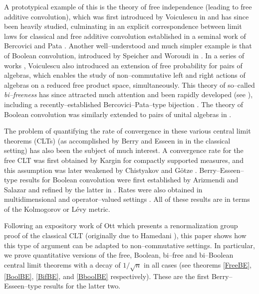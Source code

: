 \documentclass{amsart}
\theoremstyle{definition}
\theoremstyle{remark}
\numberwithin{equation}{section}
\begin{document}
A prototypical example of this is the theory of free independence (leading to free additive convolution), which was first introduced by Voiculescu in \cite{voic} and has since been heavily studied, culminating in an explicit correspondence between limit laws for classical and free additive convolution established in a seminal work of Bercovici and Pata \cite{BercoviciPata}. Another well--understood and much simpler example is that of Boolean convolution, introduced by Speicher and Woroudi in \cite{SpeicherWoroudi}. In a series of works \cite{Voiculescu1,Voiculescu2}, Voiculescu also introduced an extension of free probability for pairs of algebras, which enables the study of non--commutative left and right actions of algebras on a reduced free product space, simultaneously. This theory of so--called \textit{bi--freeness} has since attracted much attention and been rapidly developed (see \cite{CharlesworthNelsonSkoufranis1,CharlesworthNelsonSkoufranis2,GuHuangMingo, HuangWang, SkoufranisFree1, SkoufranisFree2}), including a recently--established Bercovici--Pata--type bijection \cite{HasebeHuangWang}. The theory of Boolean convolution was similarly extended to pairs of unital algebras in \cite{GuSkoufranis}.

The problem of quantifying the rate of convergence in these various central limit theorems (CLTs) (as accomplished by Berry and Esseen in \cite{Berry, Esseen} in the classical setting) has also been the subject of much interest. A convergence rate for the free CLT was first obtained by Kargin \cite{Kargin, Kargin2} for compactly supported measures, and this assumption was later weakened by Chistyakov and G{\"o}tze \cite{ChistyakovGotze1, ChistyakovGotze2}. Berry--Esseen--type results for Boolean convolution were first established by Arizmendi and Salazar \cite{ArizmendiSalazar} and refined by the latter in \cite{Salazar}. Rates were also obtained in multidimensional and operator--valued settings \cite{SpeicherMultiFree, SpeicherMultiBE, Banna, MaiSpeicher, ArizmendiBannaTseng}. All of these results are in terms of the Kolmogorov or L{\'e}vy metric. 

Following an expository work of Ott \cite{ott} which presents a renormalization group proof of the classical CLT (originally due to Hamedani \cite{hamedani}), this paper shows how this type of argument can be adapted to non--commutative settings. In particular, we prove quantitative versions of the free, Boolean, bi--free and bi--Boolean central limit theorems with a decay of $1/\sqrt{n}$ in all cases (see theorems \ref{FreeBE}, \ref{BoolBE}, \ref{BifBE}, and \ref{BboolBE} respectively). These are the first Berry--Esseen--type results for the latter two. 
\end{document}
